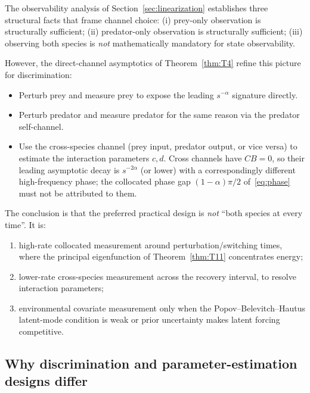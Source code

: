 The observability analysis of Section~\ref{sec:linearization} establishes three structural facts that frame channel choice:
(i) prey-only observation is structurally sufficient;
(ii) predator-only observation is structurally sufficient;
(iii) observing both species is \emph{not} mathematically mandatory for state observability.

However, the direct-channel asymptotics of Theorem~\ref{thm:T4} refine this picture for discrimination:
\begin{itemize}
\item Perturb prey and measure prey to expose the leading \(s^{-\alpha}\) signature directly.
\item Perturb predator and measure predator for the same reason via the predator self-channel.
\item Use the cross-species channel (prey input, predator output, or vice versa) to estimate the interaction parameters \(c, d\). Cross channels have \(CB = 0\), so their leading asymptotic decay is \(s^{-2\alpha}\) (or lower) with a correspondingly different high-frequency phase; the collocated phase gap \((1-\alpha)\pi/2\) of~\eqref{eq:phase} must not be attributed to them.
\end{itemize}
The conclusion is that the preferred practical design is \emph{not} ``both species at every time''. It is:
\begin{enumerate}
\item high-rate collocated measurement around perturbation/switching times, where the principal eigenfunction of Theorem~\ref{thm:T11} concentrates energy;
\item lower-rate cross-species measurement across the recovery interval, to resolve interaction parameters;
\item environmental covariate measurement only when the Popov--Belevitch--Hautus latent-mode condition is weak or prior uncertainty makes latent forcing competitive.
\end{enumerate}

\subsection{Why discrimination and parameter-estimation designs differ}
\label{sec:disc_vs_param}

